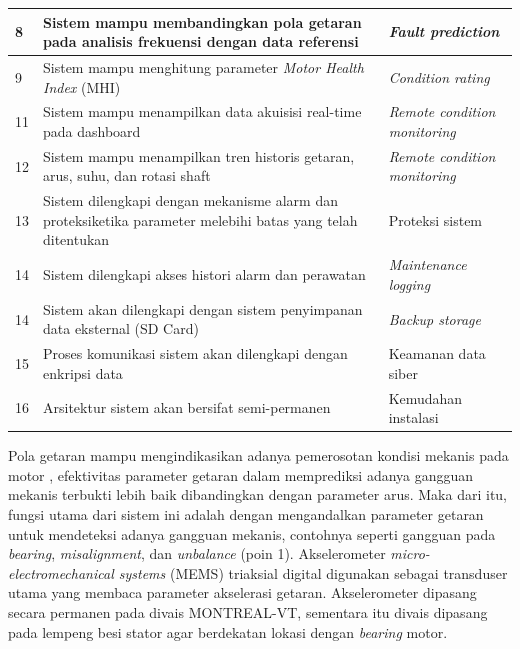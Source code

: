 \documentclass{elsinta}
\begin{document}
\begin{longtable}{|p{1.5cm}|p{7cm}|p{5cm}|}
    8 
    & Sistem mampu membandingkan pola getaran
    pada analisis frekuensi dengan data referensi
    & \textit{Fault prediction} \\
    \hline

    9 
    & Sistem mampu menghitung parameter
    \textit{Motor Health Index} (MHI) 
    & \textit{Condition rating} \\
    \hline

    11
    & Sistem mampu menampilkan data akuisisi real-time pada 
    dashboard 
    & \textit{Remote condition monitoring} \\
    \hline

    12 
    & Sistem mampu menampilkan tren historis getaran, arus, 
    suhu, dan rotasi shaft 
    & \textit{Remote condition monitoring} \\
    \hline

    13
    & Sistem dilengkapi dengan mekanisme
    alarm dan proteksiketika parameter 
    melebihi batas yang telah ditentukan 
    & Proteksi sistem \\
    \hline

    14 
    & Sistem dilengkapi akses histori
    alarm dan perawatan 
    & \textit{Maintenance logging} \\
    \hline

    14 
    & Sistem akan dilengkapi dengan sistem
    penyimpanan data eksternal (SD Card)
    & \textit{Backup storage}\\
    \hline

    15
    & Proses komunikasi sistem akan dilengkapi dengan enkripsi data
    & Keamanan data siber\\
    \hline

    16
    & Arsitektur sistem akan bersifat semi-permanen
    & Kemudahan instalasi\\
    \hline

\end{longtable}

Pola getaran mampu mengindikasikan adanya pemerosotan kondisi mekanis pada motor \cite{1.1.1},
efektivitas parameter getaran dalam memprediksi adanya gangguan mekanis terbukti
lebih baik dibandingkan dengan parameter arus\cite{1.1.2}. Maka dari itu, fungsi utama
dari sistem ini adalah dengan mengandalkan parameter getaran untuk mendeteksi adanya gangguan mekanis,
contohnya seperti gangguan pada \textit{bearing}, \textit{misalignment}, dan \textit{unbalance} (poin 1). Akselerometer
\textit{micro-electromechanical systems} (MEMS) triaksial
digital digunakan sebagai transduser utama yang membaca parameter akselerasi getaran.
Akselerometer dipasang secara permanen pada divais MONTREAL-VT, sementara itu divais 
dipasang pada lempeng besi stator agar berdekatan lokasi dengan \textit{bearing} 
motor\cite{2.1.4}.
\end{document}
